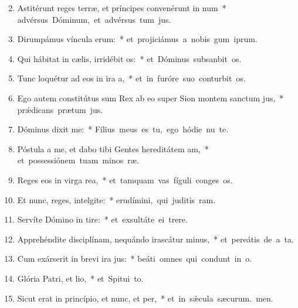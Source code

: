 \begin{flushleft}
\begin{enumerate}[leftmargin=*]
\setcounter{enumi}{1}

\item Astitérunt reges terræ, et príncipes convenérunt in num~* \mbox{advérsus Dóminum, et advérsus tum jus.}

\item Dirumpámus víncula erum:~* \mbox{et projiciámus a nobis gum iprum.}

\item Qui hábitat in cælis, irridébit os:~* \mbox{et Dóminus subsanbit os.}

\item Tunc loquétur ad eos in ira a,~* \mbox{et in furóre suo conturbit os.}

\item Ego autem constitútus sum Rex ab eo super Sion montem sanctum jus,~* \mbox{pr\'{\ae}dicans prætum jus.}

\item Dóminus dixit  me:~* \mbox{Fílius meus es tu, ego hódie nu te.}

\item Póstula a me, et dabo tibi Gentes hereditátem am,~* \mbox{et possessiónem tuam minos ræ.}

\item Reges eos in virga rea,~* \mbox{et tamquam vas fíguli conges os.}

\item Et nunc, reges, intelgite:~* \mbox{erudímini, qui juditis ram.}

\item Servíte Dómino in tire:~* \mbox{et exsultáte ei  trere.}

\item Apprehéndite disciplínam, nequándo irascátur minus,~* \mbox{et pereátis de a ta.}

\item Cum exárserit in brevi ira jus:~* \mbox{beáti omnes qui condunt in o.}

\item Glória Patri, et lio,~* \mbox{et Spitui to.}

\item Sicut erat in princípio, et nunc, et per,~* \mbox{et in s\'{\ae}cula sæcurum. men.}


\end{enumerate}
\end{flushleft}

